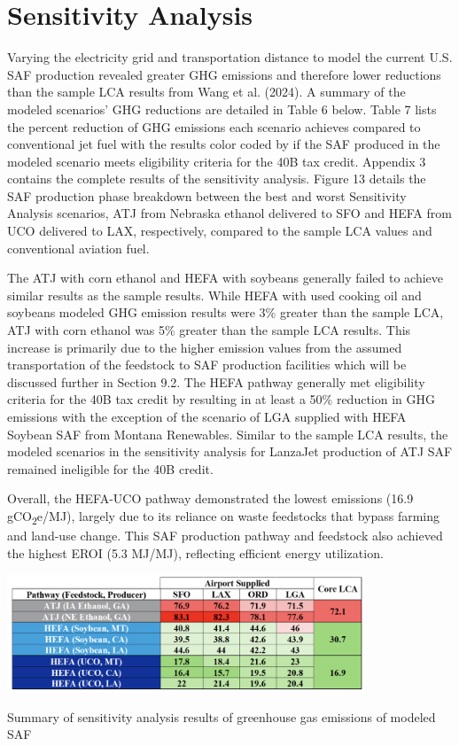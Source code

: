 \documentclass[12pt]{article}
\begin{document}
\section{Sensitivity Analysis}

Varying the electricity grid and transportation distance to model the current U.S. SAF production revealed greater GHG emissions and therefore lower reductions than the sample LCA results from Wang et al. (2024). A summary of the modeled scenarios’ GHG reductions are detailed in Table 6 below. Table 7 lists the percent reduction of GHG emissions each scenario achieves compared to conventional jet fuel with the results color coded by if the SAF produced in the modeled scenario meets eligibility criteria for the 40B tax credit. Appendix 3 contains the complete results of the sensitivity analysis. Figure 13 details the SAF production phase breakdown between the best and worst Sensitivity Analysis scenarios, ATJ from Nebraska ethanol delivered to SFO and HEFA from UCO delivered to LAX, respectively, compared to the sample LCA values and conventional aviation fuel. 

The ATJ with corn ethanol and HEFA with soybeans generally failed to achieve similar results as the sample results. While HEFA with used cooking oil and soybeans modeled GHG emission results were 3\% greater than the sample LCA, ATJ with corn ethanol was 5\% greater than the sample LCA results. This increase is primarily due to the higher emission values from the assumed transportation of the feedstock to SAF production facilities which will be discussed further in Section 9.2. The HEFA pathway generally met eligibility criteria for the 40B tax credit by resulting in at least a 50\% reduction in GHG emissions with the exception of the scenario of LGA supplied with HEFA Soybean SAF from Montana Renewables. Similar to the sample LCA results, the modeled scenarios in the sensitivity analysis for LanzaJet production of ATJ SAF remained ineligible for the 40B credit. 

Overall, the HEFA-UCO pathway demonstrated the lowest emissions (16.9 gCO\textsubscript{2}e/MJ), largely due to its reliance on waste feedstocks that bypass farming and land-use change. This SAF production pathway and feedstock also achieved the highest EROI (5.3 MJ/MJ), reflecting efficient energy utilization.


\begin{table}[H]
\centering
\includegraphics[width=0.8\textwidth]{Figures/num.png} %
\caption{Summary of sensitivity analysis results of greenhouse gas emissions of modeled SAF}
\label{table:num}
\end{table}
\end{document}
